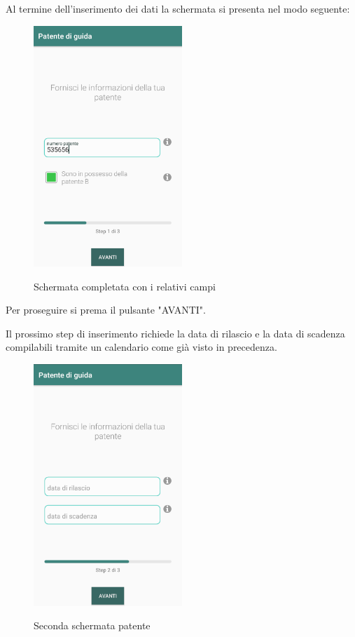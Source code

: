 \begin{itemize}
Al termine dell'inserimento dei dati la schermata si presenta nel modo seguente:
\begin{figure}[H] 
	\centering 
	\includegraphics[width=0.5\textwidth]{res/images/patente1_1.png}\\
	\caption{Schermata completata con i relativi campi}
	\label{patente3}
\end{figure}
Per proseguire si prema il pulsante "AVANTI".
\pagebreak

Il prossimo step di inserimento richiede la data di rilascio e la data di scadenza compilabili tramite un calendario come già visto in precedenza.
\begin{figure}[H] 
	\centering 
	\includegraphics[width=0.5\textwidth]{res/images/patente2.png}\\
	\caption{Seconda schermata patente}
	\label{patente4}
\end{figure}
\pagebreak


\end{itemize}
